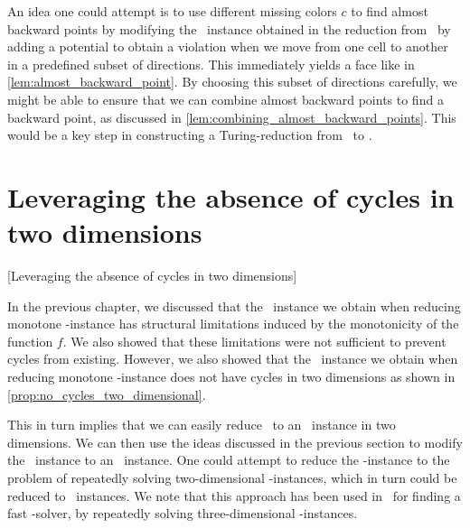 An idea one could attempt is to use different missing colors $c$ to find almost backward points by modifying the \EndOfLine\ instance obtained in the reduction from \Tarskistar\ by adding a potential to obtain a violation when we move from one cell to another in a predefined subset of directions. This immediately yields a face like in \cref{lem:almost_backward_point}. By choosing this subset of directions carefully, we might be able to ensure that we can combine almost backward points to find a backward point, as discussed in \cref{lem:combining_almost_backward_points}. This would be a key step in constructing a Turing-reduction from \Tarskistar\ to \EndOfPotentialLine\@.

\section{Leveraging the absence of cycles in two dimensions}[Leveraging the absence of cycles in two dimensions]

In the previous chapter, we discussed that the \EndOfLine\ instance we obtain when reducing monotone \Tarskistar-instance has structural limitations induced by the monotonicity of the function $f$. We also showed that these limitations were not sufficient to prevent cycles from existing. However, we also showed that the \EndOfLine\ instance we obtain when reducing monotone \Tarskistar-instance does not have cycles in two dimensions as shown in \cref{prop:no_cycles_two_dimensional}.

This in turn implies that we can easily reduce \Tarskistar\ to an \EndOfPotentialLine\ instance in two dimensions. We can then use the ideas discussed in the previous section to modify the \EndOfLine\ instance to an \EndOfPotentialLine\ instance. One could attempt to reduce the \Tarski-instance to the problem of repeatedly solving two-dimensional \Tarski-instances, which in turn could be reduced to \EndOfPotentialLine\ instances. We note that this approach has been used in~ for finding a fast \Tarski-solver, by repeatedly solving three-dimensional \Tarski-instances.